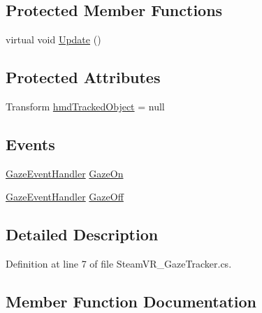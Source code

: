 \subsection*{Protected Member Functions}
\begin{DoxyCompactItemize}
\item 
virtual void \mbox{\hyperlink{class_valve_1_1_v_r_1_1_extras_1_1_steam_v_r___gaze_tracker_a2aec55ddcc6a0955dbe56c67de31beb0}{Update}} ()
\end{DoxyCompactItemize}
\subsection*{Protected Attributes}
\begin{DoxyCompactItemize}
\item 
Transform \mbox{\hyperlink{class_valve_1_1_v_r_1_1_extras_1_1_steam_v_r___gaze_tracker_a2de05e867aa506475e4284eabbb83aaf}{hmd\+Tracked\+Object}} = null
\end{DoxyCompactItemize}
\subsection*{Events}
\begin{DoxyCompactItemize}
\item 
\mbox{\hyperlink{namespace_valve_1_1_v_r_1_1_extras_a4cb3a72925225d55e7ba6357ef173696}{Gaze\+Event\+Handler}} \mbox{\hyperlink{class_valve_1_1_v_r_1_1_extras_1_1_steam_v_r___gaze_tracker_ae4bf23980f9d4691397085e6035b9c2f}{Gaze\+On}}
\item 
\mbox{\hyperlink{namespace_valve_1_1_v_r_1_1_extras_a4cb3a72925225d55e7ba6357ef173696}{Gaze\+Event\+Handler}} \mbox{\hyperlink{class_valve_1_1_v_r_1_1_extras_1_1_steam_v_r___gaze_tracker_ab9588f6fc6eb70e08fe4b2831830a369}{Gaze\+Off}}
\end{DoxyCompactItemize}


\subsection{Detailed Description}


Definition at line 7 of file Steam\+V\+R\+\_\+\+Gaze\+Tracker.\+cs.



\subsection{Member Function Documentation}
\mbox{\label{class_valve_1_1_v_r_1_1_extras_1_1_steam_v_r___gaze_tracker_a6521565fa9566d687c5d33121e4171bb}} 
